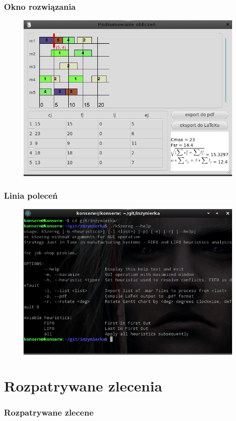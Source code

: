 \documentclass{prezentacja}
\begin{document}
\begin{frame}
    \frametitle{Okno rozwiązania}
    \begin{figure}[htb]
        \centering
        \includegraphics[height=.8\textheight, keepaspectratio=true]{./obrazki/s2}
    \end{figure}    
\end{frame}
\begin{frame}
    \frametitle{Linia poleceń}
    \begin{figure}[htb]
        \centering
        \includegraphics[height=.8\textheight, keepaspectratio=true]{./obrazki/s3}
    \end{figure}  
\end{frame}
\section{Rozpatrywane zlecenia}
\begin{frame}
    \frametitle{Rozpatrywane zlecene}
    
    
\end{frame}
\end{document}
